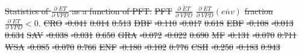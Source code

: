 \documentclass[hess, manuscript]{copernicus}
\providecommand{\DIFdeltex}[1]{{\protect\color{red}\sout{#1}}}                      %
\providecommand{\DIFdelFL}[1]{\DIFdel{#1}} %
\providecommand{\DIFdel}[1]{\texorpdfstring{\DIFdeltex{#1}}{}} %
\begin{document}
{%
\DIFdelFL{Statistics of $\frac{\partial \; ET}{\partial \; VPD}$ as a
    function of PFT.}}
\DIFdelFL{PFT }%
\DIFdelFL{$\overline{\frac{\partial \; ET}{\partial \; VPD}}$ }%
\DIFdelFL{$\frac{\partial \; ET}{\partial \; VPD}\left(\overline{env}\right)$ }%
\DIFdelFL{fraction $\frac{\partial \; ET}{\partial \; VPD} < 0.$ }%
\DIFdelFL{CRO }%
\DIFdelFL{-0.041 }%
\DIFdelFL{0.014 }%
\DIFdelFL{0.513 }%
\DIFdelFL{DBF }%
\DIFdelFL{-0.110 }%
\DIFdelFL{-0.017 }%
\DIFdelFL{0.618 }%
\DIFdelFL{EBF }%
\DIFdelFL{-0.108 }%
\DIFdelFL{-0.013 }%
\DIFdelFL{0.634 }%
\DIFdelFL{SAV }%
\DIFdelFL{-0.038 }%
\DIFdelFL{-0.031 }%
\DIFdelFL{0.650 }%
\DIFdelFL{GRA }%
\DIFdelFL{-0.072 }%
\DIFdelFL{-0.022 }%
\DIFdelFL{0.690 }%
\DIFdelFL{MF }%
\DIFdelFL{-0.131 }%
\DIFdelFL{-0.070 }%
\DIFdelFL{0.711 }%
\DIFdelFL{WSA }%
\DIFdelFL{-0.085 }%
\DIFdelFL{-0.070 }%
\DIFdelFL{0.766 }%
\DIFdelFL{ENF }%
\DIFdelFL{-0.180 }%
\DIFdelFL{-0.102 }%
\DIFdelFL{0.776 }%
\DIFdelFL{CSH }%
\DIFdelFL{-0.250 }%
\DIFdelFL{-0.183 }%
\DIFdelFL{0.943 }%

\end{document}
